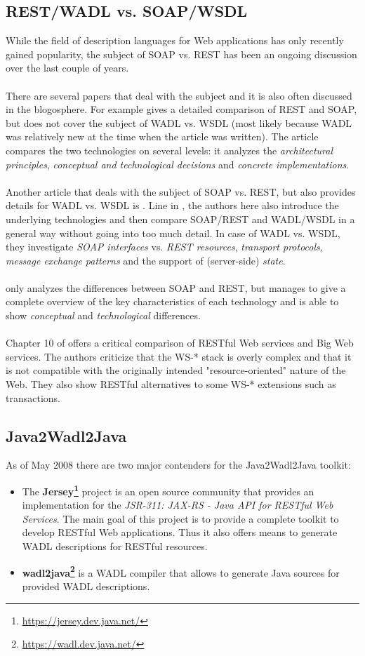 \subsection{REST/WADL vs. SOAP/WSDL}
While the field of description languages for Web applications has only recently gained popularity, the subject of SOAP vs. REST has been an ongoing discussion over the last couple of years.
\\ \\
There are several papers that deal with the subject and it is also often discussed in the blogosphere. For example \cite{BIGREST} gives a detailed comparison of REST and SOAP, but does not cover the subject of WADL vs. WSDL (most likely because WADL was relatively new at the time when the article was written). The article compares the two technologies on several levels: it analyzes the \emph{architectural principles}, \emph{conceptual and technological decisions} and \emph{concrete implementations}.
\\ \\
Another article that deals with the subject of SOAP vs. REST, but also provides details for WADL vs. WSDL is \cite{WADLWSDL}. Line in \cite{BIGREST}, the authors here also introduce the underlying technologies and then compare SOAP/REST and WADL/WSDL in a general way without going into too much detail. In case of WADL vs. WSDL, they investigate \emph{SOAP interfaces} vs. \emph{REST resources}, \emph{transport protocols}, \emph{message exchange patterns} and the support of (server-side) \emph{state}.
\\ \\
\cite{BRINGBACKWEB} only analyzes the differences between SOAP and REST, but manages to give a complete overview of the key characteristics of each technology and is able to show \emph{conceptual} and \emph{technological} differences.
\\ \\
Chapter 10 of \cite{RESTFULWEB} offers a critical comparison of RESTful Web services and Big Web services. The authors criticize that the WS-* stack is overly complex and that it is not compatible with the originally intended "resource-oriented" nature of the Web. They also show RESTful alternatives to some WS-* extensions such as transactions.

\subsection{Java2Wadl2Java}

As of May 2008 there are two major contenders for the Java2Wadl2Java toolkit: 
\begin{itemize}
\item{The {\bf Jersey\footnote{\url{https://jersey.dev.java.net/}}} project is an open source community that provides an implementation for the \emph{JSR-311: JAX-RS - Java API for RESTful Web Services}. The main goal of this project is to provide a complete toolkit to develop RESTful Web applications. Thus it also offers means to generate WADL descriptions for RESTful resources.}
\item{{\bf wadl2java\footnote{\url{https://wadl.dev.java.net/}}} is a WADL compiler that allows to generate Java sources for provided WADL descriptions.}
\end{itemize}
